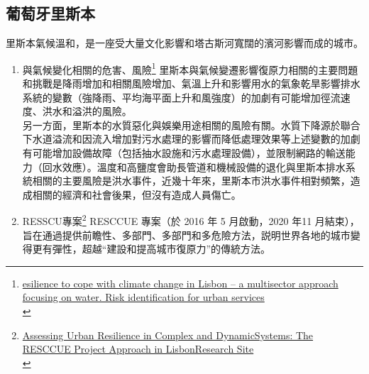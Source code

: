 \documentclass[a4paper,12pt]{article}
\begin{document}
\subsection{葡萄牙里斯本}
\label{sec:org1db952c}
里斯本氣候溫和，是一座受大量文化影響和塔古斯河寬闊的濱河影響而成的城市。\\
\begin{enumerate}
\item 與氣候變化相關的危害、風險\footnote{\href{https://www.researchgate.net/publication/322526416\_Resilience\_to\_cope\_with\_climate\_change\_in\_Lisbon\_-\_a\_multisector\_approach\_focusing\_on\_water\_Risk\_identification\_for\_urban\_services}{esilience to cope with climate change in Lisbon – a multisector approach focusing on water. Risk identification for urban services}\\}
\label{sec:org528bf3f}
里斯本與氣候變遷影響復原力相關的主要問題和挑戰是降雨增加和相關風險增加、氣溫上升和影響用水的氣象乾旱影響排水系統的變數（強降雨、平均海平面上升和風強度）的加劇有可能增加徑流速度、洪水和溢洪的風險。\\

另一方面，里斯本的水質惡化與娛樂用途相關的風險有關。水質下降源於聯合下水道溢流和因流入增加對污水處理的影響而降低處理效果等上述變數的加劇有可能增加設備故障（包括抽水設施和污水處理設備），並限制網路的輸送能力（回水效應）。溫度和高鹽度會助長管道和機械設備的退化與里斯本排水系統相關的主要風險是洪水事件，近幾十年來，里斯本市洪水事件相對頻繁，造成相關的經濟和社會後果，但沒有造成人員傷亡。\\
\item RESSCU專案\footnote{\href{https://www.google.com/url?sa=t\&rct=j\&q=\&esrc=s\&source=web\&cd=\&ved=2ahUKEwikleO6gdDvAhW0JaYKHWrkBoIQFjAEegQIAhAD\&url=https\%3A\%2F\%2Fwww.mdpi.com\%2F2071-1050\%2F12\%2F21\%2F8931\%2Fpdf\&usg=AOvVaw1QA1hhOGw26SQiir9XhUi2}{Assessing Urban Resilience in Complex and DynamicSystems: The RESCCUE Project Approach in LisbonResearch Site}\\}
\label{sec:org75d9e13}
RESCCUE 專案（於 2016 年 5 月啟動，2020 年11 月結束），旨在通過提供前瞻性、多部門、多部門和多危險方法，説明世界各地的城市變得更有彈性，超越``建設和提高城市復原力''的傳統方法。\\


\end{enumerate}
\end{document}
